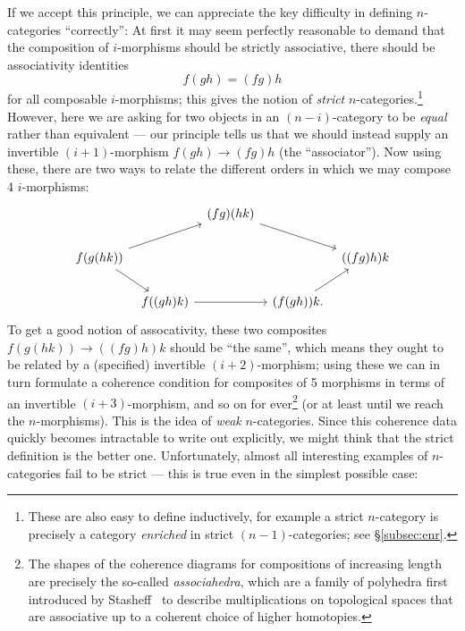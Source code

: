 \documentclass[a4paper,11pt]{article}
\begin{document}
If we accept this principle, we can appreciate the key difficulty in
defining $n$-categories ``correctly'': At first it may seem perfectly
reasonable to demand that the composition of $i$-morphisms should be
strictly associative, \ie{} there should be associativity identities
\[f(gh) = (fg)h\] for all composable $i$-morphisms; this gives the
notion of \emph{strict} $n$-categories.\footnote{These are also easy to
define inductively, for example a strict $n$-category is precisely a
category \emph{enriched} in strict $(n-1)$-categories; see \S\ref{subsec:enr}.}
However, here we are asking for two objects in an $(n-i)$-category to be \emph{equal}
rather than equivalent --- our principle tells us that we should instead 
supply an invertible
$(i+1)$-morphism $f(gh) \to (fg)h$ (the ``associator''). Now using these,
there are two ways to relate the different orders in which we may
compose 4 $i$-morphisms:
\begin{equation}
  \label{eq:pentagon}
  \begin{tikzcd}[column sep=tiny]
    {} &  & (fg)(hk) \arrow{drr}\\
    f(g(hk)) \arrow{dr}\arrow{urr} & & & & ((fg)h)k \\
    & f((gh)k) \arrow{rr} & & (f(gh))k. \arrow{ur}
  \end{tikzcd}
\end{equation}
To get a good notion of assocativity, these two composites
$f(g(hk)) \to ((fg)h)k$ should be ``the same'', which means they ought
to be related by a (specified) invertible $(i+2)$-morphism; using
these we can in turn formulate a coherence condition for composites of
5 morphisms in terms of an invertible $(i+3)$-morphism, and so on for
ever\footnote{The shapes of the coherence diagrams for compositions of
  increasing length are precisely the so-called \emph{associahedra},
  which are a family of polyhedra first introduced by
  Stasheff~\cite{Stasheff} to describe multiplications on topological
  spaces that are associative up to a coherent choice of higher
  homotopies.}
(or at least until we reach the
$n$-morphisms). This is the idea of \emph{weak} $n$-categories. Since
this coherence data quickly becomes intractable to write out
explicitly, we might think that the strict definition is the better
one. Unfortunately, almost all interesting examples of $n$-categories
fail to be strict --- this is true even in the simplest possible case:
\end{document}
